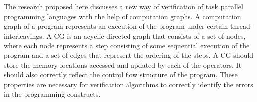  The research proposed here discusses a new way of verification of task parallel programming languages with the help of computation graphs. A computation graph of a program represents an execution of the program under certain thread-interleavings. A CG is an acyclic directed graph that consists of a set of nodes, where each node represents a step consisting of some sequential execution of the program and a set of edges that represent the ordering of the steps. A CG should store the memory locations accessed and updated by each of the operators. It should also correctly reflect the control flow structure of the program. These properties are necessary for verification algorithms to correctly identify the errors in the programming constructs.